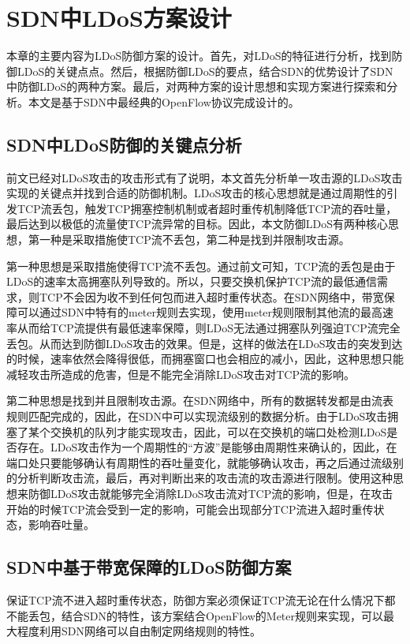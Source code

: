 \chapter{SDN中LDoS方案设计}
\label{cha:design}
本章的主要内容为LDoS防御方案的设计。首先，对LDoS的特征进行分析，找到防御LDoS的关键点点。然后，根据防御LDoS的要点，结合SDN的优势设计了SDN中防御LDoS的两种方案。最后，对两种方案的设计思想和实现方案进行探索和分析。本文是基于SDN中最经典的OpenFlow协议完成设计的。

\section{SDN中LDoS防御的关键点分析}
\label{chap4:keyanalysis}
前文已经对LDoS攻击的攻击形式有了说明，本文首先分析单一攻击源的LDoS攻击实现的关键点并找到合适的防御机制。LDoS攻击的核心思想就是通过周期性的引发TCP流丢包，触发TCP拥塞控制机制或者超时重传机制降低TCP流的吞吐量，最后达到以极低的流量使TCP流异常的目标。因此，本文防御LDoS有两种核心思想，第一种是采取措施使TCP流不丢包，第二种是找到并限制攻击源。

第一种思想是采取措施使得TCP流不丢包。通过前文可知，TCP流的丢包是由于LDoS的速率太高拥塞队列导致的。所以，只要交换机保护TCP流的最低通信需求，则TCP不会因为收不到任何包而进入超时重传状态。在SDN网络中，带宽保障可以通过SDN中特有的meter规则去实现，使用meter规则限制其他流的最高速率从而给TCP流提供有最低速率保障，则LDoS无法通过拥塞队列强迫TCP流完全丢包。从而达到防御LDoS攻击的效果。但是，这样的做法在LDoS攻击的突发到达的时候，速率依然会降得很低，而拥塞窗口也会相应的减小，因此，这种思想只能减轻攻击所造成的危害，但是不能完全消除LDoS攻击对TCP流的影响。

第二种思想是找到并且限制攻击源。在SDN网络中，所有的数据转发都是由流表规则匹配完成的，因此，在SDN中可以实现流级别的数据分析。由于LDoS攻击拥塞了某个交换机的队列才能实现攻击，因此，可以在交换机的端口处检测LDoS是否存在。LDoS攻击作为一个周期性的“方波”是能够由周期性来确认的，因此，在端口处只要能够确认有周期性的吞吐量变化，就能够确认攻击，再之后通过流级别的分析判断攻击流，最后，再对判断出来的攻击流的攻击源进行限制。使用这种思想来防御LDoS攻击就能够完全消除LDoS攻击流对TCP流的影响，但是，在攻击开始的时候TCP流会受到一定的影响，可能会出现部分TCP流进入超时重传状态，影响吞吐量。

\section{SDN中基于带宽保障的LDoS防御方案}
\label{chap4:bandguatee}

保证TCP流不进入超时重传状态，防御方案必须保证TCP流无论在什么情况下都不能丢包，结合SDN的特性，该方案结合OpenFlow的Meter规则来实现，可以最大程度利用SDN网络可以自由制定网络规则的特性。


